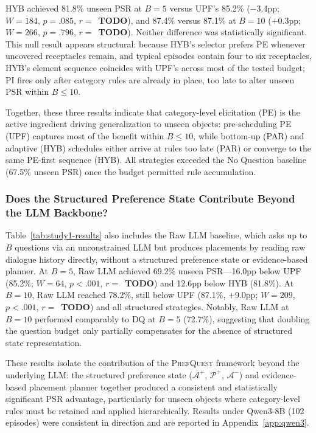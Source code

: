 \documentclass[manuscript,review,anonymous]{acmart}
\newcommand{\revend}{\color{black}}       %
\renewcommand{\revend}{}
\begin{document}
{HYB achieved 81.8\% unseen PSR at $B=5$ versus UPF's 85.2\% ($-$3.4pp; $W = 184$, $p = .085$, $r = $~\textbf{TODO}), and 87.4\% versus 87.1\% at $B=10$ ($+$0.3pp; $W = 266$, $p = .796$, $r = $~\textbf{TODO}). Neither difference was statistically significant. This null result appears structural: because HYB's selector prefers PE whenever uncovered receptacles remain, and typical episodes contain four to six receptacles, HYB's element sequence coincides with UPF's across most of the tested budget; PI fires only after category rules are already in place, too late to alter unseen PSR within $B \leq 10$.

Together, these three results indicate that category-level elicitation (PE) is the active ingredient driving generalization to unseen objects: pre-scheduling PE (UPF) captures most of the benefit within $B \leq 10$, while bottom-up (PAR) and adaptive (HYB) schedules either arrive at rules too late (PAR) or converge to the same PE-first sequence (HYB). All strategies exceeded the No Question baseline (67.5\% unseen PSR) once the budget permitted rule accumulation.

\subsubsection{Does the Structured Preference State Contribute Beyond the LLM Backbone?}

Table~\ref{tab:study1-results} also includes the Raw LLM baseline, which asks up to $B$ questions via an unconstrained LLM but produces placements by reading raw dialogue history directly, without a structured preference state or evidence-based planner. At $B=5$, Raw LLM achieved 69.2\% unseen PSR---16.0pp below UPF (85.2\%; $W = 64$, $p < .001$, $r = $~\textbf{TODO}) and 12.6pp below HYB (81.8\%). At $B=10$, Raw LLM reached 78.2\%, still below UPF (87.1\%, $+$9.0pp; $W = 209$, $p < .001$, $r = $~\textbf{TODO}) and all structured strategies. Notably, Raw LLM at $B=10$ performed comparably to DQ at $B=5$ (72.7\%), suggesting that doubling the question budget only partially compensates for the absence of structured state representation.

These results isolate the contribution of the \textsc{PrefQuest} framework beyond the underlying LLM: the structured preference state ($\mathcal{A}^+$, $\mathcal{P}^+$, $\mathcal{A}^-$) and evidence-based placement planner together produced a consistent and statistically significant PSR advantage, particularly for unseen objects where category-level rules must be retained and applied hierarchically. Results under Qwen3-8B (102 episodes) were consistent in direction and are reported in Appendix~\ref{app:qwen3}.

\revend}
\end{document}
